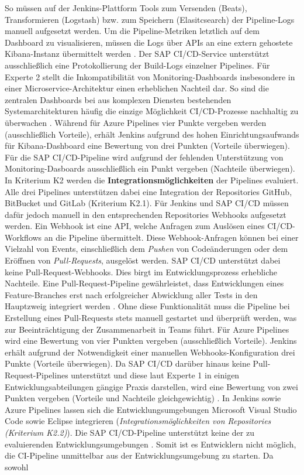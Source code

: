 \vspace*{-15mm}
So müssen auf der Jenkins-Plattform Tools zum Versenden (Beats), Transformieren (Logstash) bzw. zum Speichern (Elasitcsearch) der Pipeline-Logs manuell aufgesetzt werden. Um die Pipeline-Metriken letztlich auf dem Dashboard zu visualisieren, müssen die Logs über APIs an eine extern gehostete Kibana-Instanz übermittelt werden \cite{Atta.20201012}. Der SAP CI/CD-Service unterstützt ausschließlich eine Protokollierung der Build-Logs einzelner Pipelines. Für Experte 2 stellt die Inkompatibilität von Monitoring-Dashboards insbesondere in einer Microservice-Architektur einen erheblichen Nachteil dar. So sind die zentralen Dashboards bei aus komplexen Diensten bestehenden Systemarchitekturen häufig die einzige Möglichkeit CI/CD-Prozesse nachhaltig zu überwachen \cite[Z. 39]{ProductManagerSAPHyperspaceCICD.}. Während für Azure Pipelines vier Punkte vergeben werden (ausschließlich Vorteile), erhält Jenkins aufgrund des hohen Einrichtungsaufwands für Kibana-Dashboard eine Bewertung von drei Punkten (Vorteile überwiegen). Für die SAP CI/CD-Pipeline wird aufgrund der fehlenden Unterstützung von Monitoring-Dasboards ausschließlich ein Punkt vergeben (Nachteile überwiegen). In Kriterium K2 werden die \textbf{Integrationsmöglichkeiten} der Pipelines evaluiert. Alle drei Pipelines unterstützen dabei eine Integration der Repositories GitHub, BitBucket und GitLab (Kriterium K2.1). Für Jenkins und SAP CI/CD müssen dafür jedoch manuell in den entsprechenden Repositories Webhooks aufgesetzt werden. Ein Webhook ist eine API, welche Anfragen zum Auslösen eines CI/CD-Workflows an die Pipeline übermittelt. Diese Webhook-Anfragen können bei einer Vielzahl von Events, einschließlich dem \textit{Pushen} von Codeänderungen oder dem Eröffnen von \textit{Pull-Requests}, ausgelöst werden. SAP CI/CD unterstützt dabei keine Pull-Request-Webhooks. Dies birgt im Entwicklungsprozess erhebliche Nachteile. Eine Pull-Request-Pipeline gewährleistet, dass Entwicklungen eines Feature-Branches erst nach erfolgreicher Abwicklung aller Tests in den Hauptzweig integriert werden \cite[Z. 27 ff.]{ProductOwnerSAPBTPProd&Infra.}. Ohne diese Funktionalität muss die Pipeline bei Erstellung eines Pull-Requests stets manuell gestartet und überprüft werden, was zur Beeinträchtigung der Zusammenarbeit in Teams führt. Für Azure Pipelines wird eine Bewertung von vier Punkten vergeben (ausschließlich Vorteile). Jenkins erhält aufgrund der Notwendigkeit einer manuellen Webhooks-Konfiguration drei Punkte (Vorteile überwiegen). Da SAP CI/CD darüber hinaus keine Pull-Request-Pipelines unterstützt und diese laut Experte 1 in einigen Entwicklungsabteilungen gängige Praxis darstellen, wird eine Bewertung von zwei Punkten vergeben (Vorteile und Nachteile gleichgewichtig) \cite[Z. 27 ff.]{ProductOwnerSAPBTPProd&Infra.}. In Jenkins sowie Azure Pipelines lassen sich die Entwicklungsumgebungen Microsoft Visual Studio Code sowie Eclipse integrieren (\textit{Integrationsmöglichkeiten von Repositories (Kriterium K2.2)}). Die SAP CI/CD-Pipeline unterstützt keine der zu evaluierenden Entwicklungsumgebungen \cite[Z. 91 ff.]{ProductOwnerSAPBTPProd&Infra.}. Somit ist es Entwicklern nicht möglich, die CI-Pipeline unmittelbar aus der Entwicklungsumgebung zu starten. Da sowohl 